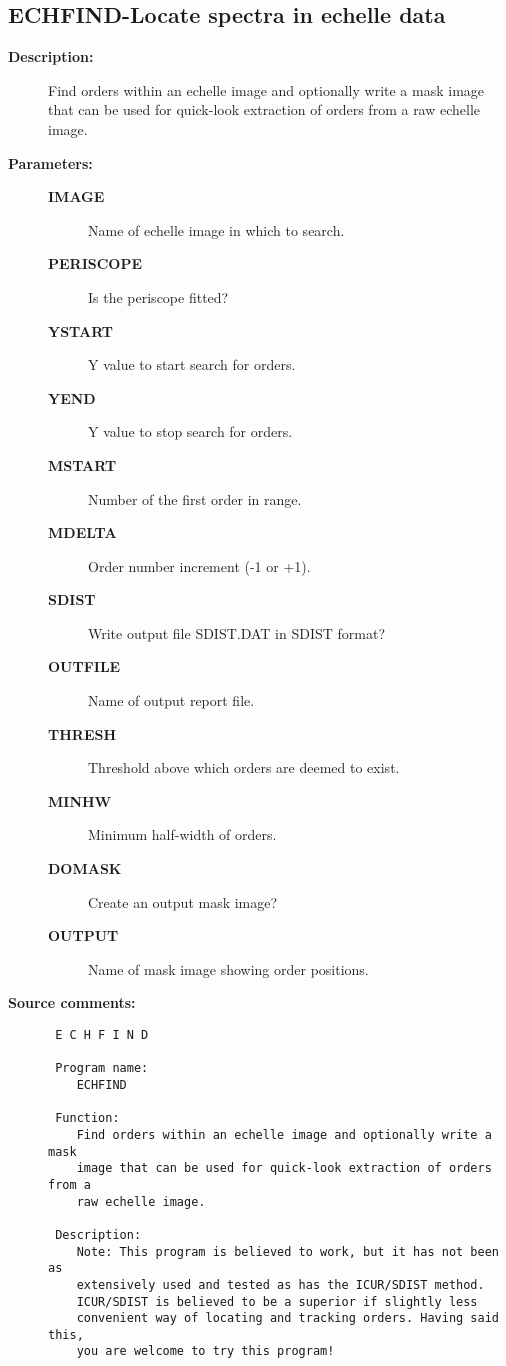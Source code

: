\subsection{ECHFIND-\label{ECHFIND}Locate spectra in echelle data}
\begin{description}

\item [{\bf Description:}]
 Find orders within an echelle image and optionally write a mask
 image that can be used for quick-look extraction of orders from a
 raw echelle image.

\item [{\bf Parameters:}]
\begin{description}
\item [{\bf IMAGE}]
 Name of echelle image in which to search.
\item [{\bf PERISCOPE}]
 Is the periscope fitted?
\item [{\bf YSTART}]
 Y value to start search for orders.
\item [{\bf YEND}]
 Y value to stop search for orders.
\item [{\bf MSTART}]
 Number of the first order in range.
\item [{\bf MDELTA}]
 Order number increment (-1 or +1).
\item [{\bf SDIST}]
 Write output file SDIST.DAT in SDIST format?
\item [{\bf OUTFILE}]
 Name of output report file.
\item [{\bf THRESH}]
 Threshold above which orders are deemed to exist.
\item [{\bf MINHW}]
 Minimum half-width of orders.
\item [{\bf DOMASK}]
 Create an output mask image?
\item [{\bf OUTPUT}]
 Name of mask image showing order positions.
\end{description}

\item [{\bf Source comments:}]
\begin{verbatim}
 E C H F I N D

 Program name:
    ECHFIND

 Function:
    Find orders within an echelle image and optionally write a mask
    image that can be used for quick-look extraction of orders from a
    raw echelle image.

 Description:
    Note: This program is believed to work, but it has not been as
    extensively used and tested as has the ICUR/SDIST method.
    ICUR/SDIST is believed to be a superior if slightly less
    convenient way of locating and tracking orders. Having said this,
    you are welcome to try this program!


\end{verbatim}
\end{description}
